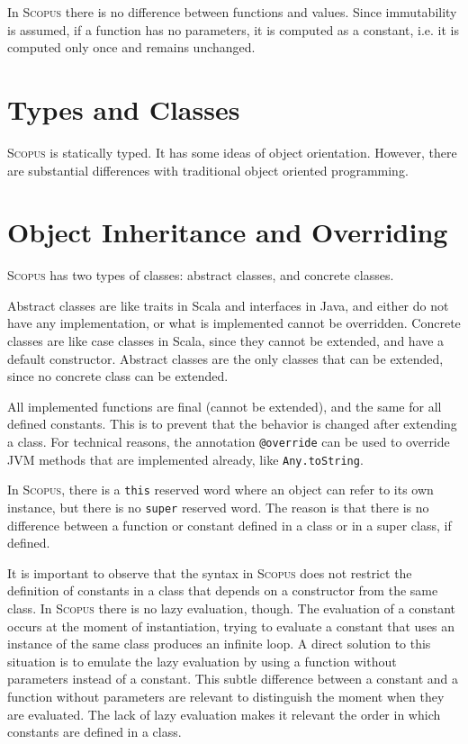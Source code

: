 \documentclass[12pt,a4paper]{book}
\makeatletter
\newcommand{\srccode}[1]{\texttt{{#1}}}
\newcommand{\reservedWord}[1]{{\color{blue}\srccode{#1}}\xspace}
\newcommand{\annotation}[1]{{\color{brown}\srccode{#1}}\xspace}
\newcommand{\sthis}{\reservedWord{this}}
\newcommand{\soverride}{\annotation{@override}}
\newcommand{\Scopus}{\textsc{Scopus}\xspace}
\makeatother
\begin{document}
    In \Scopus there is no difference between functions and values.
    Since immutability is assumed, if a function has no parameters, it is computed as a constant, i.e. it is computed only once and remains unchanged.


    \section{Types and Classes}

    \Scopus is statically typed.
    It has some ideas of object orientation.
    However, there are substantial differences with traditional object oriented programming.


    \section{Object Inheritance and Overriding}

    \Scopus has two types of classes: abstract classes, and concrete classes.

    Abstract classes are like traits in Scala and interfaces in Java, and either do not have any implementation, or what is implemented cannot be overridden.
    Concrete classes are like case classes in Scala, since they cannot be extended, and have a default constructor.
    Abstract classes are the only classes that can be extended, since no concrete class can be extended.

    All implemented functions are final (cannot be extended), and the same for all defined constants.
    This is to prevent that the behavior is changed after extending a class.
    For technical reasons, the annotation \soverride can be used to override JVM methods that are implemented already, like \srccode{Any.toString}.

    In \Scopus, there is a \sthis reserved word where an object can refer to its own instance, but there is no \srccode{super} reserved word.
    The reason is that there is no difference between a function or constant defined in a class or in a super class, if defined.

    It is important to observe that the syntax in \Scopus does not restrict the definition of constants in a class that depends on a constructor from the same class.
    In \Scopus there is no lazy evaluation, though.
    The evaluation of a constant occurs at the moment of instantiation, trying to evaluate a constant that uses an instance of the same class produces an infinite loop.
    A direct solution to this situation is to emulate the lazy evaluation by using a function without parameters instead of a constant.
    This subtle difference between a constant and a function without parameters are relevant to distinguish the moment when they are evaluated.
    The lack of lazy evaluation makes it relevant the order in which constants are defined in a class.
\end{document}
